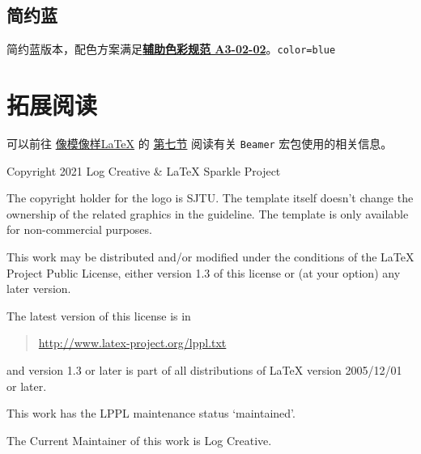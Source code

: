 \documentclass[a4paper,12pt]{article}
\begin{document}
\begin{CJK}{UTF8}{song}
\subsection{简约蓝}

简约蓝版本，配色方案满足\href{http://vi.sjtu.edu.cn/index.php/articles/base/3}{\textbf{辅助色彩规范 A3-02-02}}。\hfill \texttt{color=blue}

\begin{tcbraster}[raster columns=2,colframe=blue,colback=white,
    colbacktitle=blue!50!white,fonttitle=\small\bfseries\ttfamily,
    left=0pt,right=0pt,top=0pt,bottom=0pt,boxsep=0pt,boxrule=0.6pt,
    toptitle=1mm,bottomtitle=1mm,drop lifted shadow,center title,
    graphics pages={1,...,6}]
\end{tcbraster}

\section{拓展阅读}
可以前往 \href{https://logcreative.github.io/LaTeXSparkle/}{像模像样\LaTeX} 的 \href{https://logcreative.github.io/LaTeXSparkle/src/art/chapter07.html}{第七节} 阅读有关 \verb"Beamer" 宏包使用的相关信息。

\scriptsize  

\newpage
Copyright 2021 Log Creative \& \LaTeX{} Sparkle Project

The copyright holder for the logo is SJTU. The template itself doesn't change the ownership of the related graphics in the guideline. The template is only available for non-commercial purposes.

This work may be distributed and/or modified under the
conditions of the \LaTeX{} Project Public License, either version 1.3 of this license or (at your option) any later version.

The latest version of this license is in
\begin{quotation}
    \href{http://www.latex-project.org/lppl.txt}{http://www.latex-project.org/lppl.txt}
\end{quotation}
and version 1.3 or later is part of all distributions of \LaTeX{}
version 2005/12/01 or later.

This work has the LPPL maintenance status `maintained'.

The Current Maintainer of this work is Log Creative.

%

\end{CJK}
\end{document}
